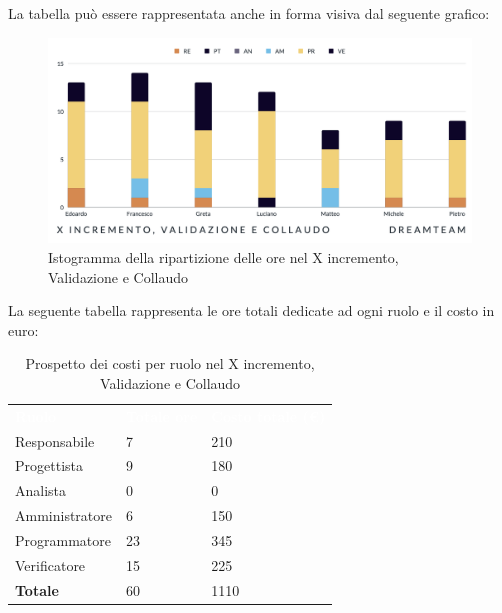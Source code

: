 La tabella può essere rappresentata anche in forma visiva dal seguente grafico:
\begin{figure}[H]
\centering
\includegraphics[scale=0.55]{Sezioni/SezioniPreventivo/grafici/Preventivo_validazione_collaudo_X.png}
\caption{Istogramma della ripartizione delle ore nel X incremento, Validazione e Collaudo}
\end{figure}

La seguente tabella rappresenta le ore totali dedicate ad ogni ruolo e il costo in euro:

\begin{table}[H]
\begin{center}
\renewcommand{\arraystretch}{1.5}
\begin{tabular}{ m{}<{\centering}  m{}<{\centering} m{}<{\centering}}
	\rowcolor{darkblue}
	\textcolor{white}{\textbf{Ruolo}}&\textcolor{white}{\textbf{Totale ore}}&\textcolor{white}{\textbf{Costo totale (\euro)}}\\ 

	Responsabile  & 7 & 210 \\	
	
	Progettista & 9 & 180 \\
	
	Analista & 0 & 0 \\

	Amministratore & 6 & 150 \\
	
	Programmatore & 23 & 345 \\
	
	Verificatore & 15 & 225 \\
	
	\textbf{Totale} & 60 & 1110 \\
	
\end{tabular}
\caption{Prospetto dei costi per ruolo nel X incremento, Validazione e Collaudo}
\end{center}
\end{table}

